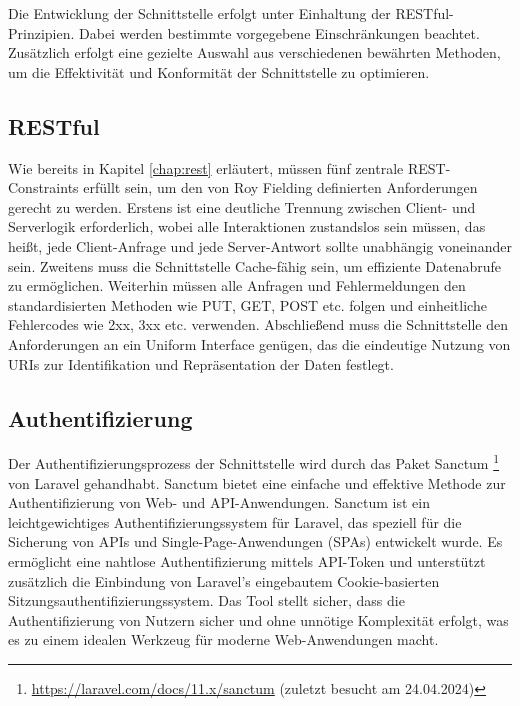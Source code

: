 \documentclass[draft,final]{vutinfth} %
\begin{document}
Die Entwicklung der Schnittstelle erfolgt unter Einhaltung der RESTful-Prinzipien. 
Dabei werden bestimmte vorgegebene Einschränkungen beachtet. 
Zusätzlich erfolgt eine gezielte Auswahl aus verschiedenen bewährten Methoden, um die Effektivität und Konformität der Schnittstelle zu optimieren.


\subsection{RESTful}

Wie bereits in Kapitel \ref{chap:rest} erläutert, müssen fünf zentrale REST-Constraints erfüllt sein, um den von Roy Fielding definierten Anforderungen gerecht zu werden. 
Erstens ist eine deutliche Trennung zwischen Client- und Serverlogik erforderlich, wobei alle Interaktionen zustandslos sein müssen, das heißt, jede Client-Anfrage und jede Server-Antwort sollte unabhängig voneinander sein. Zweitens muss die Schnittstelle Cache-fähig sein, um effiziente Datenabrufe zu ermöglichen. 
Weiterhin müssen alle Anfragen und Fehlermeldungen den standardisierten Methoden wie PUT, GET, POST etc. folgen und einheitliche Fehlercodes wie 2xx, 3xx etc. verwenden. 
Abschließend muss die Schnittstelle den Anforderungen an ein Uniform Interface genügen, das die eindeutige Nutzung von URIs zur Identifikation und Repräsentation der Daten festlegt.


\subsection{Authentifizierung}


Der Authentifizierungsprozess der Schnittstelle wird durch das Paket Sanctum
\footnote{
	\url{https://laravel.com/docs/11.x/sanctum} (zuletzt besucht am 24.04.2024)
} 
von Laravel gehandhabt. 
Sanctum bietet eine einfache und effektive Methode zur Authentifizierung von Web- und API-Anwendungen.
Sanctum ist ein leichtgewichtiges Authentifizierungssystem für Laravel, das speziell für die Sicherung von APIs und Single-Page-Anwendungen (SPAs) entwickelt wurde. 
Es ermöglicht eine nahtlose Authentifizierung mittels API-Token und unterstützt zusätzlich die Einbindung von Laravel's eingebautem Cookie-basierten Sitzungsauthentifizierungssystem. 
Das Tool stellt sicher, dass die Authentifizierung von Nutzern sicher und ohne unnötige Komplexität erfolgt, was es zu einem idealen Werkzeug für moderne Web-Anwendungen macht. \cite{Steven:2023:Sanctum}
\end{document}
